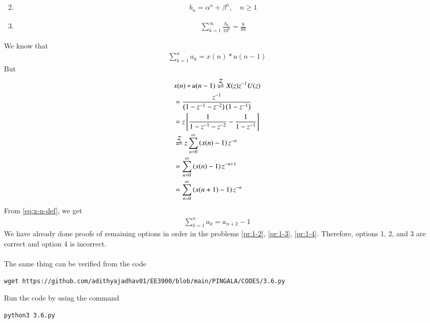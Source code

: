 \documentclass[journal,12pt,twocolumn]{IEEEtran}
\renewcommand\thesection{\arabic{section}}
\begin{document}
\begin{enumerate}[label=\thesection.\arabic*,ref=\thesection.\theenumi]
\begin{enumerate}
\begin{align}
\end{align}
 \item 
\begin{align}
	b_n =\alpha^n + \beta^n, \quad n \ge 1
\end{align}
 \item 
\begin{align}
	\sum_{k=1}^{\infty}\frac{b_k}{10^k} =\frac{8}{89}
\end{align}
\end{enumerate}
\solution We know that
\begin{align}
    \sum_{k = 1}^{n}a_k = x(n)*u(n - 1)
\end{align}
But
\begin{align}
    &x(n)*u(n - 1) \overset{\mathcal{Z}}{ \rightleftharpoons} X(z)z^{-1}U(z) \\
    &= \frac{z^{-1}}{\left(1 - z^{-1} - z^{-2}\right)\left(1 - z^{-1}\right)} \\
    &= z{}\left[\frac{1}{1 - z^{-1} - z^{-2}} - \frac{1}{1 - z^{-1}}\right] \\
    &\overset{\mathcal{Z}}{ \rightleftharpoons} z\sum_{n = 0}^{\infty}\left(x(n) - 1\right)z^{-n} \\
    &= \sum_{n = 0}^{\infty}\left(x(n) - 1\right)z^{-n + 1} \\
    &= \sum_{n = 0}^{\infty}\left(x(n + 1) - 1\right)z^{-n} \\
\end{align}
From \eqref{eq:x-n-def}, we get
\begin{align}
    \sum_{k = 1}^{n}a_k = a_{n+2} - 1
\end{align}
We have already done proofs of remaining options in order in the problems
\eqref{pr:1-2}, \eqref{pr:1-3}, \eqref{pr:1-4}. Therefore, options 1, 2,
and 3 are correct and option 4 is incorrect.\\
\\The same thing can be verified from the code 
\begin{lstlisting}
wget https://github.com/adithyajadhav01/EE3900/blob/main/PINGALA/CODES/3.6.py
\end{lstlisting}

Run the code by using the command
\begin{lstlisting}
python3 3.6.py

\end{lstlisting}
\end{enumerate}
\end{document}
